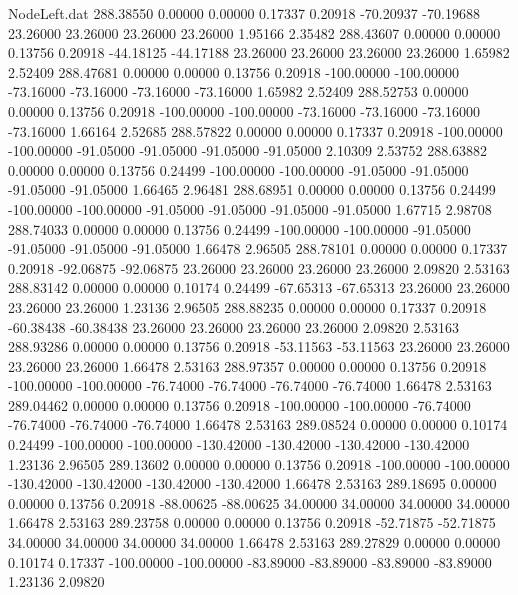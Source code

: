 \begin{filecontents}{NodeLeft.dat}
 288.38550    0.00000    0.00000     0.17337    0.20918  -70.20937  -70.19688   23.26000   23.26000   23.26000   23.26000    1.95166    2.35482
 288.43607    0.00000    0.00000     0.13756    0.20918  -44.18125  -44.17188   23.26000   23.26000   23.26000   23.26000    1.65982    2.52409
 288.47681    0.00000    0.00000     0.13756    0.20918 -100.00000 -100.00000  -73.16000  -73.16000  -73.16000  -73.16000    1.65982    2.52409
 288.52753    0.00000    0.00000     0.13756    0.20918 -100.00000 -100.00000  -73.16000  -73.16000  -73.16000  -73.16000    1.66164    2.52685
 288.57822    0.00000    0.00000     0.17337    0.20918 -100.00000 -100.00000  -91.05000  -91.05000  -91.05000  -91.05000    2.10309    2.53752
 288.63882    0.00000    0.00000     0.13756    0.24499 -100.00000 -100.00000  -91.05000  -91.05000  -91.05000  -91.05000    1.66465    2.96481
 288.68951    0.00000    0.00000     0.13756    0.24499 -100.00000 -100.00000  -91.05000  -91.05000  -91.05000  -91.05000    1.67715    2.98708
 288.74033    0.00000    0.00000     0.13756    0.24499 -100.00000 -100.00000  -91.05000  -91.05000  -91.05000  -91.05000    1.66478    2.96505
 288.78101    0.00000    0.00000     0.17337    0.20918  -92.06875  -92.06875   23.26000   23.26000   23.26000   23.26000    2.09820    2.53163
 288.83142    0.00000    0.00000     0.10174    0.24499  -67.65313  -67.65313   23.26000   23.26000   23.26000   23.26000    1.23136    2.96505
 288.88235    0.00000    0.00000     0.17337    0.20918  -60.38438  -60.38438   23.26000   23.26000   23.26000   23.26000    2.09820    2.53163
 288.93286    0.00000    0.00000     0.13756    0.20918  -53.11563  -53.11563   23.26000   23.26000   23.26000   23.26000    1.66478    2.53163
 288.97357    0.00000    0.00000     0.13756    0.20918 -100.00000 -100.00000  -76.74000  -76.74000  -76.74000  -76.74000    1.66478    2.53163
 289.04462    0.00000    0.00000     0.13756    0.20918 -100.00000 -100.00000  -76.74000  -76.74000  -76.74000  -76.74000    1.66478    2.53163
 289.08524    0.00000    0.00000     0.10174    0.24499 -100.00000 -100.00000 -130.42000 -130.42000 -130.42000 -130.42000    1.23136    2.96505
 289.13602    0.00000    0.00000     0.13756    0.20918 -100.00000 -100.00000 -130.42000 -130.42000 -130.42000 -130.42000    1.66478    2.53163
 289.18695    0.00000    0.00000     0.13756    0.20918  -88.00625  -88.00625   34.00000   34.00000   34.00000   34.00000    1.66478    2.53163
 289.23758    0.00000    0.00000     0.13756    0.20918  -52.71875  -52.71875   34.00000   34.00000   34.00000   34.00000    1.66478    2.53163
 289.27829    0.00000    0.00000     0.10174    0.17337 -100.00000 -100.00000  -83.89000  -83.89000  -83.89000  -83.89000    1.23136    2.09820

\end{filecontents}
